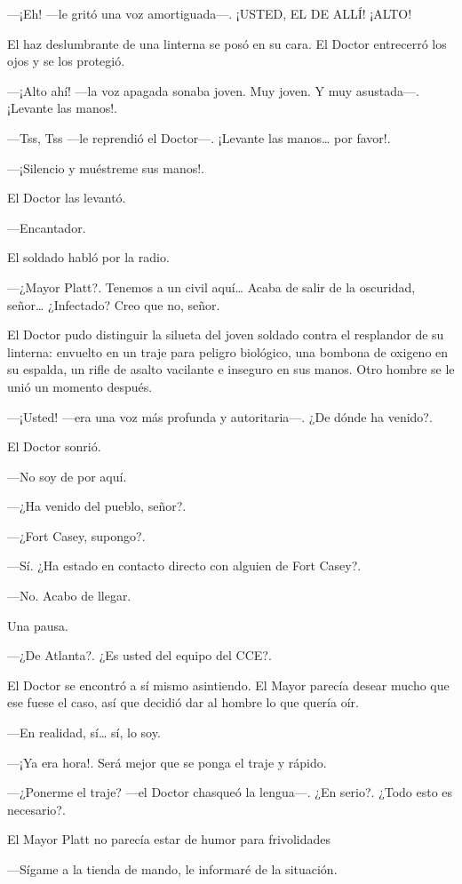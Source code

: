 ---¡Eh! ---le gritó una voz amortiguada---. ¡USTED, EL DE ALLÍ! ¡ALTO!

El haz deslumbrante de una linterna se posó en su cara. El Doctor
entrecerró los ojos y se los protegió.

---¡Alto ahí! ---la voz apagada sonaba joven. Muy joven. Y muy
asustada---. ¡Levante las manos!.

---Tss, Tss ---le reprendió el Doctor---. ¡Levante las manos\ldots{} por
favor!.

---¡Silencio y muéstreme sus manos!.

El Doctor las levantó.

---Encantador.

El soldado habló por la radio.

---¿Mayor Platt?. Tenemos a un civil aquí\ldots{} Acaba de salir de la
oscuridad, señor\ldots{} ¿Infectado? Creo que no, señor.

El Doctor pudo distinguir la silueta del joven soldado contra el
resplandor de su linterna: envuelto en un traje para peligro biológico,
una bombona de oxigeno en su espalda, un rifle de asalto vacilante e
inseguro en sus manos. Otro hombre se le unió un momento después.

---¡Usted! ---era una voz más profunda y autoritaria---. ¿De dónde ha
venido?.

El Doctor sonrió.

---No soy de por aquí.

---¿Ha venido del pueblo, señor?.

---¿Fort Casey, supongo?.

---Sí. ¿Ha estado en contacto directo con alguien de Fort Casey?.

---No. Acabo de llegar.

Una pausa.

---¿De Atlanta?. ¿Es usted del equipo del CCE?.

El Doctor se encontró a sí mismo asintiendo. El Mayor parecía desear
mucho que ese fuese el caso, así que decidió dar al hombre lo que quería
oír.

---En realidad, sí\ldots{} sí, lo soy.

---¡Ya era hora!. Será mejor que se ponga el traje y rápido.

---¿Ponerme el traje? ---el Doctor chasqueó la lengua---. ¿En serio?.
¿Todo esto es necesario?.

El Mayor Platt no parecía estar de humor para frivolidades

---Sígame a la tienda de mando, le informaré de la situación.

